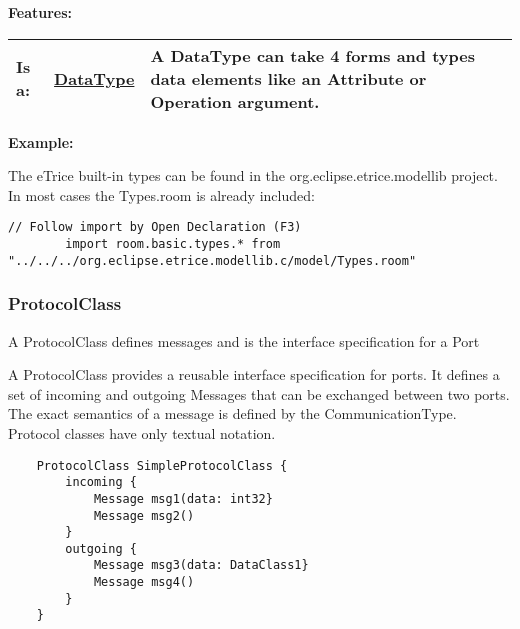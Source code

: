 	\begingroup
	\textbf{Features:}
	\renewcommand{\arraystretch}{1.8} %
	\begin{longtable}{l|l p{}}
		\hline
	Is a: & \tabitem \hyperlink{ref:DataType}{DataType}  & A DataType can take 4 forms and types data elements like an Attribute or Operation argument.\\
	\hline
	\end{longtable}
	\endgroup
		
		
	\textbf{Example:}
	
		The eTrice built-in types can be found in the \textsf{org.eclipse.etrice.modellib} project. In most cases the \textsf{Types.room} is already included:
		\begin{lstlisting}[language=ROOM]
		// Follow import by Open Declaration (F3)
		import room.basic.types.* from "../../../org.eclipse.etrice.modellib.c/model/Types.room"
		\end{lstlisting}
	
	\vspace{\baselineskip}
	\vspace{\baselineskip}
	\vspace{\baselineskip}
	
\subsubsection{ProtocolClass}
	\hypertarget{ref:ProtocolClass}{}
	A ProtocolClass defines messages and is the interface specification for a Port
		
	A ProtocolClass provides a reusable interface specification for ports. It defines a set of incoming and outgoing Messages that can be exchanged between two ports.
	The exact semantics of a message is defined by the CommunicationType.
	Protocol classes have only textual notation.
	
	\begin{lstlisting}
	ProtocolClass SimpleProtocolClass {
		incoming {
			Message msg1(data: int32}
			Message msg2()
		}
		outgoing {
			Message msg3(data: DataClass1}
			Message msg4()
		}
	}
	\end{lstlisting}
		
